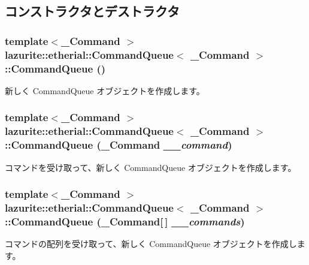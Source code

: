 \subsection{コンストラクタとデストラクタ}
\hypertarget{classlazurite_1_1etherial_1_1_command_queue_3_01___command_01_4_af98c1d5ddaa57b05950cedb16ae2e6b0}{
\subsubsection[{CommandQueue}]{\setlength{\rightskip}{0pt plus 5cm}template$<$\_\-Command $>$ lazurite::etherial::CommandQueue$<$ \_\-Command $>$::CommandQueue ()}}
\label{classlazurite_1_1etherial_1_1_command_queue_3_01___command_01_4_af98c1d5ddaa57b05950cedb16ae2e6b0}
新しく CommandQueue オブジェクトを作成します。 \hypertarget{classlazurite_1_1etherial_1_1_command_queue_3_01___command_01_4_aba0ecac621350efb2d73d04cf16a9f36}{
\subsubsection[{CommandQueue}]{\setlength{\rightskip}{0pt plus 5cm}template$<$\_\-Command $>$ lazurite::etherial::CommandQueue$<$ \_\-Command $>$::CommandQueue (\_\-Command {\em \_\-\_\-command})}}
\label{classlazurite_1_1etherial_1_1_command_queue_3_01___command_01_4_aba0ecac621350efb2d73d04cf16a9f36}
コマンドを受け取って、新しく CommandQueue オブジェクトを作成します。 \hypertarget{classlazurite_1_1etherial_1_1_command_queue_3_01___command_01_4_a16dc85d35c80526592aea0c03962f7ac}{
\subsubsection[{CommandQueue}]{\setlength{\rightskip}{0pt plus 5cm}template$<$\_\-Command $>$ lazurite::etherial::CommandQueue$<$ \_\-Command $>$::CommandQueue (\_\-Command\mbox{[}$\,$\mbox{]} {\em \_\-\_\-commands})}}
\label{classlazurite_1_1etherial_1_1_command_queue_3_01___command_01_4_a16dc85d35c80526592aea0c03962f7ac}
コマンドの配列を受け取って、新しく CommandQueue オブジェクトを作成します。 

